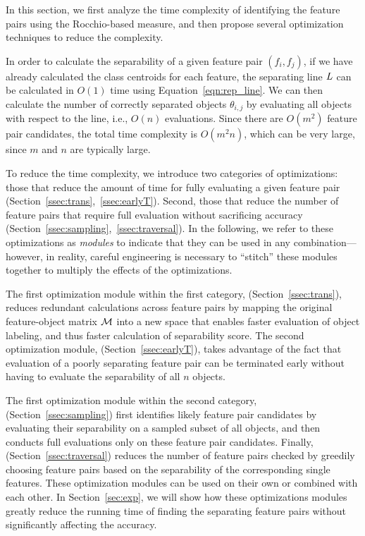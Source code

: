 In this section, we first analyze the time complexity of identifying the \topk feature pairs using the Rocchio-based measure, and then propose several optimization techniques to reduce the complexity.

 In order to calculate the separability of a given feature pair $(f_i, f_j)$, if we have already calculated the class centroids for each feature, the separating line $\mathit{L}$ can be calculated in $O(1)$ time using Equation~\ref{eqn:rep_line}. We can then calculate the number of correctly separated objects $\theta_{i,j}$ by evaluating all objects with respect to the line, i.e., $O(n)$ evaluations. Since there are $O(m^2)$ feature pair candidates, the total time complexity is $O(m^2n)$, which can be very large,
since $m$ and $n$ are typically large.

 To reduce the time complexity, we introduce two categories of optimizations:
those that reduce the amount of time
for fully evaluating a given feature pair (Section~\ref{ssec:trans},~\ref{ssec:earlyT}).
Second, those that reduce the number of feature pairs
that require full evaluation without
sacrificing accuracy (Section~\ref{ssec:sampling},~\ref{ssec:traversal}).
In the following, we refer to these optimizations as {\em modules} to indicate that they
can be used in any combination---however, in reality, careful engineering is necessary
to ``stitch'' these modules together to multiply the effects of the optimizations.

The first optimization module within the first category, \trans (Section~\ref{ssec:trans}), reduces redundant calculations across feature pairs by mapping the original feature-object matrix ${\mathcal{M}}$ into a new space that enables faster evaluation of object labeling, and thus faster calculation of separability score. The second optimization module, \earlyT (Section~\ref{ssec:earlyT}), takes advantage of the fact that evaluation of a poorly separating feature pair can be terminated early without having to evaluate the separability of all $n$ objects.

The first optimization module within the second category, \sampling
(Section~\ref{ssec:sampling}) first identifies likely \topk feature pair candidates by evaluating their separability on a sampled subset of all objects, and then conducts full evaluations only on these feature pair candidates.
Finally, \traversal (Section~\ref{ssec:traversal})
reduces the number of feature pairs checked by greedily
choosing feature pairs based on the separability of the
corresponding single features. These optimization modules can be used on their own or combined with each other.
In Section~\ref{sec:exp}, we will show how these optimizations modules greatly reduce the running time of finding the \topk separating feature pairs without significantly affecting the accuracy.

